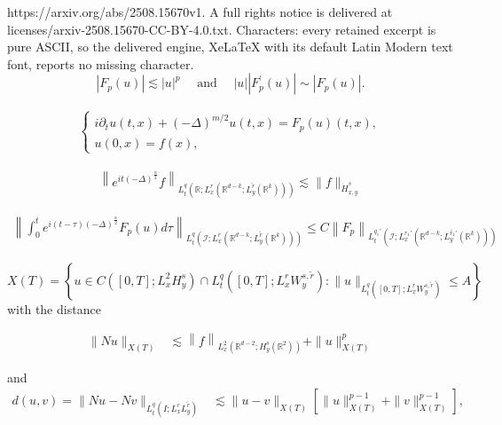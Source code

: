 \documentclass[10pt,a4paper]{amsart}
\begin{document}
https://arxiv.org/abs/2508.15670v1. A full rights notice is delivered at licenses/arxiv-2508.15670-CC-BY-4.0.txt. Characters: every retained excerpt is pure ASCII, so the delivered engine, XeLaTeX with its default Latin Modern text font, reports no missing character.
	\begin{equation} \label{nonlin}
	    \left|F_p(u)\right| \lesssim|u|^p \quad \text { and } \quad|u|\left|F_p^{\prime}(u)\right| \sim\left|F_p(u)\right| .
	\end{equation}

	\begin{align}\label{higher order}
		\begin{cases}
i\partial_t u (t, x) + (-\Delta)^{m/2} u (t, x) = F_p(u)(t, x), \\
u(0, x) = f(x),
\end{cases}
	\end{align}

			\begin{align}\label{eq11111}
				\left\|e^{i t (-\Delta)^{\frac{\alpha}{2}}} f\right\|_{L_t^q\left(\mathbb{R} ; L_x^r\left(\mathbb{R}^{d-k} ; L_y^{\tilde{r}}\left(\mathbb{R}^k\right)\right)\right)} \lesssim \|f\|_{\dot{H}_{x, y}^s}
			\end{align}

			\begin{align}\label{inhom}
				\left\|\int_0^t e^{i(t-\tau)  (-\Delta)^{\frac{\alpha}{2}}} F_p(u) d \tau\right\|_{L_t^q\left(\mathcal{I} ; L_x^r\left(\mathbb{R}^{d-k} ; L_y^{\tilde{r}}\left(\mathbb{R}^k\right)\right)\right)}  \leq C\left\|F_p\right\|_{L_t^{q_1'}\left(\mathcal{I} ; L_x^{r_1'}\left(\mathbb{R}^{d-k} ; L_y^{\tilde{r_1}'}\left(\mathbb{R}^k\right)\right)\right)}
			\end{align}

	\begin{equation} \label{evospace}
	    X(T)=\left\{u \in C\left([0, T] ; L_x^2 H_y^s\right) \cap L_t^q\left([0, T] ; L_x^r W_y^{s, \widetilde{r}}\right):  \|u\|_{L_t^q\left([0, T] ; L_x^r W_y^{s, \tilde{r}}\right)} \leq A\right\}
	\end{equation} with the distance

	\begin{align}\label{Banach1}
		\|N u\|_{X(T)} & \lesssim  \left\|f\right\|_{L_x^2\left(\mathbb{R}^{d-2} ; H_y^s\left(\mathbb{R}^2\right)\right)}+\|u\|_{X(T)}^p  \end{align}

	and \begin{align}\label{Banach2}
		d(u, v)=\|Nu-Nv\|_{L_t^q\left(I ; L_x^r L_y^{\tilde{r}}\right)}& \lesssim\|u-v\|_{X(T)}\left[  \|u\|_{X(T)}^{p-1}+\|v\|_{X(T)}^{p-1}\right],
	\end{align}
\end{document}
